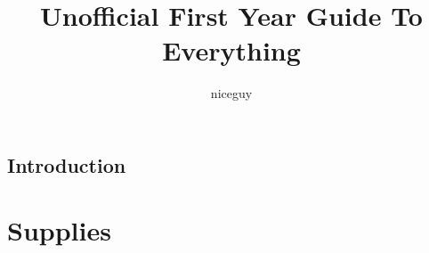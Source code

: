 \documentclass[12pt]{report}
\author{niceguy}
\title{Unofficial First Year Guide To Everything}
\begin{document}
\section{Introduction}

\chapter{Supplies}

\end{document}
